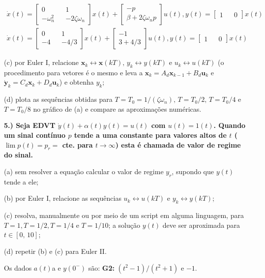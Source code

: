 \documentclass[10pt]{article}
\newcommand{\bm}[1]{\boldsymbol{#1}}
\begin{document}
\begin{align*}
    \dot{x}(t) =
    \begin{bmatrix}
        0 && 1 \\
        -\omega_n^2 && -2\zeta\omega_n
    \end{bmatrix}
    x(t) +
    \begin{bmatrix}
        -p \\
        \beta + 2 \zeta\omega_n p
    \end{bmatrix}
    u(t), y(t) =
    \begin{bmatrix}
        1 && 0
    \end{bmatrix}
    x(t) \\
    \dot{x}(t) =
    \begin{bmatrix}
        0 && 1 \\
        -4 && -4/3
    \end{bmatrix}
    x(t) +
    \begin{bmatrix}
        -1 \\
        3 + 4/3
    \end{bmatrix}
    u(t), y(t) =
    \begin{bmatrix}
        1 && 0
    \end{bmatrix}
    x(t)
\end{align*}

(c) por Euler I, relacione $\bm{x}_k \leftrightarrow \bm{x}(kT), \, y_k \leftrightarrow y(kT)$ e $u_k \leftrightarrow u(kT)$ (o procedimento para vetores é o mesmo e leva a $\bm{x}_k = A_d \bm{x}_{k - 1} + B_d \bm{u}_k$ e $\dot{\bm{y}}_k = C_d \bm{x}_k + D_d \bm{u}_k$) e obtenha $y_k$;

(d) plota as sequências obtidas para $T = T_0 = 1 / (\zeta \omega_n), \, T = T_0/2, \, T = T_0/4$ e $T = T_0/8$ no gráfico de (a) e compare as aproximações numéricas.


\vspace{\baselineskip}

\textbf{5.) Seja EDVT $\dot{y}(t) + \alpha(t)y(t) = u(t)$ com $u(t) = 1(t)$. Quando um sinal contínuo $p$ tende a uma constante para valores altos de $t$ ($\lim p(t) = p_r = $ cte. para $t \to \infty$) esta é chamada de valor de regime do sinal.}

(a) sem resolver a equação calcular o valor de regime $y_r$, supondo que $y(t)$ tende a ele;

(b) por Euler I, relacione as sequências $u_k \leftrightarrow u(kT)$ e $y_k \leftrightarrow y(kT)$;

(c) resolva, manualmente ou por meio de um script em alguma linguagem, para $T = 1, T = 1/2, T = 1/4$ e $T = 1/10$; a solução $y(t)$ deve ser aproximada para $t \in [0, \, 10]$;

(d) repetir (b) e (c) para Euler II.

Os dados $a(t)$a e $y(0^-)$ são: \textbf{G2: }$(t^2 - 1)/(t^2 + 1)$ e $-1$.
\end{document}
